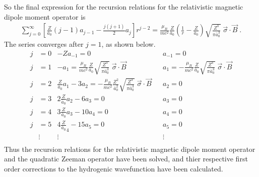     \noindent So the final expression for the recursion relations for the relativistic magnetic dipole moment operator is 
    \begin{align}
        \sum_{j = 0}^\infty \left[ \frac{Z}{\bar{a}_0}(j-1)a_{j-1} - \frac{j(j+1)}{2} a_j \right] r^{j-2} = \frac{\mu_B}{mc^2}\frac{Z}{\bar{a}_0} \left(\frac{1}{r} - \frac{Z}{\bar{a}_0} \right) \sqrt{\frac{Z^3}{\pi \bar{a}_0^3}}\; \vec{\sigma} \cdot \vec{B}\;.
    \end{align}
    \noindent The series converges after $j = 1$, as shown below.
    \begin{align*}
        j &= 0 & -Za_{-1} = 0& &a_{-1} = 0\\ \nonumber
        j &= 1 & -a_1 = \frac{\mu_B}{mc^2}\frac{Z}{\bar{a}_0}  \sqrt{\frac{Z^3}{\pi \bar{a}_0^3}}\; \vec{\sigma} \cdot \vec{B} & &a_{1} = - \frac{\mu_B}{mc^2}\frac{Z}{\bar{a}_0} \sqrt{\frac{Z^3}{\pi \bar{a}_0^3}}\; \vec{\sigma} \cdot \vec{B}\\ \nonumber
        j &= 2 & \frac{Z}{\bar{a}_0}a_1 - 3a_2 = - \frac{\mu_B}{mc^2}\frac{Z^2}{\bar{a}_0^2}  \sqrt{\frac{Z^3}{\pi \bar{a}_0^3}}\; \vec{\sigma} \cdot \vec{B} && a_2 = 0\\ \nonumber
        j &= 3 & 2\frac{Z}{\bar{a}_0}a_2 - 6a_3 = 0&& a_3 = 0\\ \nonumber
        j &= 4 & 3\frac{Z}{\bar{a}_0}a_3 - 10a_4 =0 && a_4 = 0\\ \nonumber
        j &= 5 & 4\frac{Z}{\bar{a}_0}_4 - 15a_5 = 0 && a_5 = 0 \\ \nonumber
        & \vdots & \vdots && \vdots \\
    \end{align*}
    \noindent Thus the recursion relations for the relativistic magnetic dipole moment operator and the quadratic Zeeman operator have been solved, and thier respective first order corrections to the hydrogenic wavefunction have been calculated.

